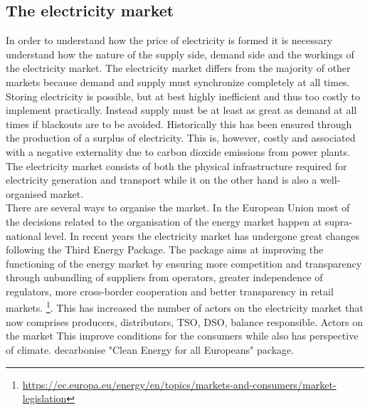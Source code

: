 \label{sec:theory}

\subsection{The electricity market}
\label{subsec:t_market}
In order to understand how the price of electricity is formed it is necessary understand how the nature of the supply side, demand side and the workings of the electricity market. The electricity market differs from the majority of other markets because demand and supply must synchronize completely at all times. Storing electricity is possible, but at best highly inefficient and thus too costly to implement practically. Instead supply must be at least as great as demand at all times if blackouts are to be avoided. Historically this has been ensured through the production of a surplus of electricity. This is, however, costly and associated with a  negative externality due to carbon dioxide emissions from power plants. \smallskip\\
The electricity market consists of both the physical infrastructure required for electricity generation and transport while it on the other hand is also a well-organised market.  
\smallskip\\
There are several ways to organise the market. In the European Union most of the decisions related to the organisation of the energy market happen at supra-national level. In recent years the electricity market has undergone great changes following the Third Energy Package. The package aims at improving the functioning of the energy market by ensuring more competition and transparency through unbundling of suppliers from operators, greater independence of regulators, more cross-border cooperation and better transparency in retail markets. \footnote{\url{https://ec.europa.eu/energy/en/topics/markets-and-consumers/market-legislation}}. This has increased the number of actors on the electricity market that now comprises producers, distributors, TSO, DSO, balance responsible. 
Actors on the market 
This improve conditions for the consumers while also has perspective of climate. 
decarbonise 
"Clean Energy for all Europeans" package. 

